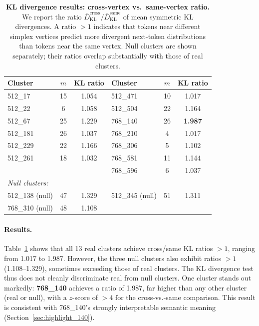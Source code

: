 \documentclass{article}
\begin{document}
\begin{table}[t]
  \centering
  \caption{%
    \textbf{KL divergence results: cross-vertex vs.\ same-vertex ratio.}
    We report the ratio $\overline{D}_{\mathrm{KL}}^{\mathrm{cross}} /
    \overline{D}_{\mathrm{KL}}^{\mathrm{same}}$ of mean symmetric KL divergences.
    A ratio $>1$ indicates that tokens near different simplex vertices predict more
    divergent next-token distributions than tokens near the same vertex.
    Null clusters are shown separately; their ratios overlap substantially with those
    of real clusters.
  }
  \label{tab:kl}
  \setlength{\tabcolsep}{6pt}
  \begin{tabular}{lcc|lcc}
    \toprule
    Cluster & $m$ & KL ratio & Cluster & $m$ & KL ratio \\
    \midrule
    512\_17   & 15 & 1.054 & 512\_471 & 10 & 1.017 \\
    512\_22   & 6  & 1.058 & 512\_504 & 22 & 1.164 \\
    512\_67   & 25 & 1.229 & 768\_140 & 26 & \textbf{1.987} \\
    512\_181  & 26 & 1.037 & 768\_210 & 4  & 1.017 \\
    512\_229  & 22 & 1.166 & 768\_306 & 5  & 1.102 \\
    512\_261  & 18 & 1.032 & 768\_581 & 11 & 1.144 \\
                &    &       & 768\_596 & 6  & 1.037 \\
    \midrule
    \multicolumn{6}{l}{\textit{Null clusters:}} \\
    512\_138 (null) & 47 & 1.329 & 512\_345 (null) & 51 & 1.311 \\
    768\_310 (null) & 48 & 1.108 &                 &    &       \\
    \bottomrule
  \end{tabular}
\end{table}

\paragraph{Results.} Table~\ref{tab:kl} shows that all 13 real clusters achieve
cross/same KL ratios $> 1$, ranging from 1.017 to 1.987.  However, the three null
clusters also exhibit ratios $> 1$ (1.108--1.329), sometimes exceeding those of real
clusters.  The KL divergence test thus does not cleanly discriminate real from null
clusters.  One cluster stands out markedly: \textbf{768\_140} achieves a ratio of
1.987, far higher than any other cluster (real or null), with a $z$-score of $> 4$
for the cross-vs.-same comparison.  This result is consistent with 768\_140's
strongly interpretable semantic meaning (Section~\ref{sec:highlight_140}).
\end{document}
